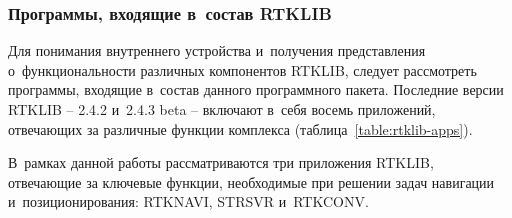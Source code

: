 \subsubsection{Программы, входящие в~состав RTKLIB}
\label{subsec:rtklib-apps}

Для понимания внутреннего устройства и~получения представления о~функциональности различных компонентов RTKLIB, следует рассмотреть программы, входящие в~состав данного программного пакета. Последние версии RTKLIB -- 2.4.2 и~2.4.3 beta -- включают в~себя восемь приложений, отвечающих за различные функции комплекса (таблица~\ref{table:rtklib-apps}).


В~рамках данной работы рассматриваются три приложения RTKLIB, отвечающие за ключевые функции, необходимые при решении задач навигации и~позиционирования: RTKNAVI, STRSVR и~RTKCONV.

\newpage

